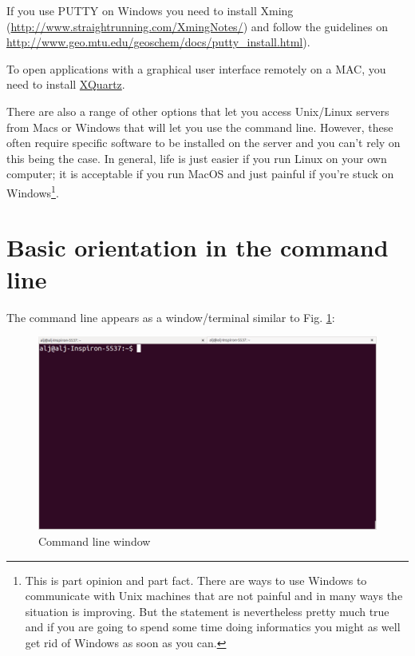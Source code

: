 \documentclass[11pt]{article}
\begin{document}
If you use PUTTY on Windows you need to install Xming
(\url{http://www.straightrunning.com/XmingNotes/}) and follow the guidelines
on \url{http://www.geo.mtu.edu/geoschem/docs/putty_install.html}).

To open applications with a graphical user interface remotely on a
MAC, you need to install \href{http://xquartz.macosforge.org/landing/}{XQuartz}.

There are also a range of other options that let you access Unix/Linux
servers from Macs or Windows that will let you use the command line. However,
these often require specific software to be installed on the server and you
can't rely on this being the case. In general, life is just easier if you run
Linux on your own computer; it is acceptable if you run MacOS and just painful
if you're stuck on Windows\footnote{This is part opinion and part fact. There are ways to use Windows to
communicate with Unix machines that are not painful and in many ways the
situation is improving. But the statement is nevertheless pretty much true
and if you are going to spend some time doing informatics you might as well
get rid of Windows as soon as you can.}.

\section{Basic orientation in the command line}
\label{sec:orgheadline15}

The command line appears as a window/terminal similar to
Fig. \ref{fig:orgparagraph1}:

\begin{figure}[htb]
\centering
\includegraphics[width=14cm]{Terminal.png}
\caption{\label{fig:orgparagraph1}
Command line window}
\end{figure}
\end{document}
